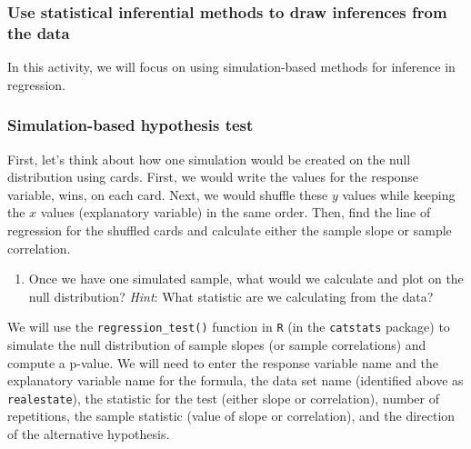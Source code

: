 \documentclass[
]{report}
\providecommand{\tightlist}{%
  \setlength{\itemsep}{0pt}\setlength{\parskip}{0pt}}
\begin{document}
\hypertarget{use-statistical-inferential-methods-to-draw-inferences-from-the-data-6}{%
\subsubsection*{Use statistical inferential methods to draw inferences from the data}\label{use-statistical-inferential-methods-to-draw-inferences-from-the-data-6}}

In this activity, we will focus on using simulation-based methods for inference in regression.

\hypertarget{simulation-based-hypothesis-test}{%
\subsubsection*{Simulation-based hypothesis test}\label{simulation-based-hypothesis-test}}

First, let's think about how one simulation would be created on the null distribution using cards. First, we would write the values for the response variable, wins, on each card. Next, we would shuffle these \(y\) values while keeping the \(x\) values (explanatory variable) in the same order. Then, find the line of regression for the shuffled cards and calculate either the sample slope or sample correlation.

\begin{enumerate}
\def\labelenumi{\arabic{enumi}.}
\setcounter{enumi}{10}
\tightlist
\item
  Once we have one simulated sample, what would we calculate and plot on the null distribution? \emph{Hint}: What statistic are we calculating from the data?
\end{enumerate}

\vspace{1in}

We will use the \texttt{regression\_test()} function in \texttt{R} (in the \texttt{catstats} package) to simulate the null distribution of sample slopes (or sample correlations) and compute a p-value. We will need to enter the response variable name and the explanatory variable name for the formula, the data set name (identified above as \texttt{realestate}), the statistic for the test (either slope or correlation), number of repetitions, the sample statistic (value of slope or correlation), and the direction of the alternative hypothesis.
\end{document}
